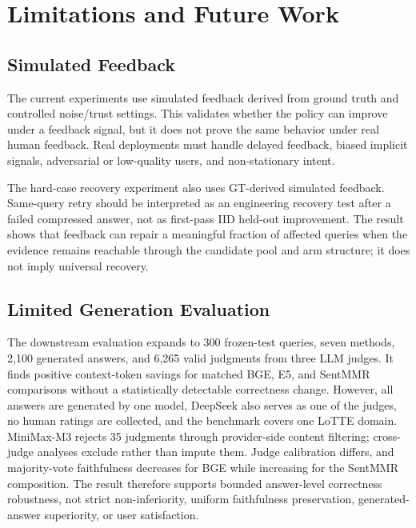 
\section{Limitations and Future Work}
\label{sec:08-limitations:limitations-and-future-work}

\subsection{Simulated Feedback}
\label{sec:08-limitations:simulated-feedback}

The current experiments use simulated feedback derived from ground truth and controlled noise/trust settings. This validates whether the policy can improve under a feedback signal, but it does not prove the same behavior under real human feedback. Real deployments must handle delayed feedback, biased implicit signals, adversarial or low-quality users, and non-stationary intent.

The hard-case recovery experiment also uses GT-derived simulated feedback. Same-query retry should be interpreted as an engineering recovery test after a failed compressed answer, not as first-pass IID held-out improvement. The result shows that feedback can repair a meaningful fraction of affected queries when the evidence remains reachable through the candidate pool and arm structure; it does not imply universal recovery.

\subsection{Limited Generation Evaluation}
\label{sec:08-limitations:limited-generation-evaluation}

The downstream evaluation expands to 300 frozen-test queries, seven methods, 2,100 generated answers, and 6,265 valid judgments from three LLM judges. It finds positive context-token savings for matched BGE, E5, and SentMMR comparisons without a statistically detectable correctness change. However, all answers are generated by one model, DeepSeek also serves as one of the judges, no human ratings are collected, and the benchmark covers one LoTTE domain. MiniMax-M3 rejects 35 judgments through provider-side content filtering; cross-judge analyses exclude rather than impute them. Judge calibration differs, and majority-vote faithfulness decreases for BGE while increasing for the SentMMR composition. The result therefore supports bounded answer-level correctness robustness, not strict non-inferiority, uniform faithfulness preservation, generated-answer superiority, or user satisfaction.

